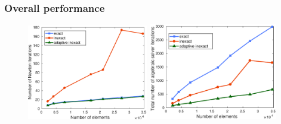 \documentclass[aspectratio=169]{beamer}
\begin{document}
\begin{frame}
\frametitle{Overall performance}
\begin{figure}
\includegraphics[width=0.47\textwidth]{fig_article_chap_1/comparison_three_methods_number_Newton_iter_number_elements.eps}  \quad  
 \includegraphics[width=0.50\textwidth]{fig_article_chap_1/comparison_three_methods_total_number_Newton_Gmres_iter_number_elements.eps}     
\end{figure}
\end{frame}
\end{document}
